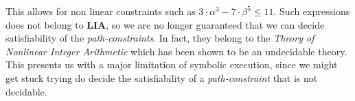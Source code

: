 	This allows for non linear constraints such as $3 \cdot \alpha ^3 - 7\cdot \beta ^ 5 \leq 11$. Such expressions does not belong to \textbf{LIA}, so we are no longer guaranteed that we can decide satisfiability of the \emph{path-constraints}. In fact, they belong to the \emph{Theory of Nonlinear Integer Arithmetic} which has been shown to be an undecidable theory. %
	This presents us with a major limitation of symbolic execution, since we might get stuck trying do decide the satisfiability of a \emph{path-constraint} that is not decidable.
	
	\fi	